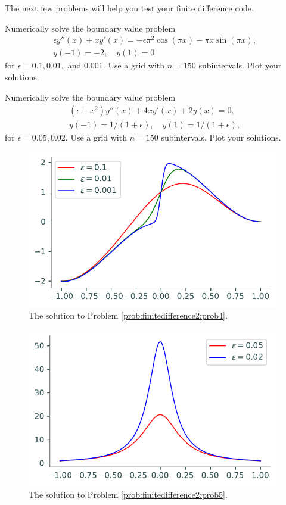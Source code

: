 The next few problems will help you test your finite difference code.

\begin{problem}
Numerically solve the boundary value problem
\begin{align*}
	\epsilon y''(x) + xy'(x) = -\epsilon \pi^2 \cos(\pi x) - \pi x \sin(\pi x), \\
	y(-1) = -2, \quad y(1) = 0,
\end{align*}
for $\epsilon = 0.1, 0.01,$ and $0.001$. Use a grid with $n=150$ subintervals. Plot your solutions.
\label{prob:finitedifference2:prob4}
\end{problem}

\begin{problem}
Numerically solve the boundary value problem
\begin{align*}
	(\epsilon +x^2)y''(x) + 4xy'(x) + 2y(x) = 0, \\
	y(-1) = 1/(1+\epsilon), \quad y(1) = 1/(1+\epsilon),
\end{align*}
for $\epsilon = 0.05, 0.02$. Use a grid with $n=150$ subintervals. Plot your solutions.
\label{prob:finitedifference2:prob5}
\end{problem}

\begin{figure}[h]
\centering
\includegraphics[width=11cm]{figures/figure4.pdf}
\caption{The solution to Problem \ref{prob:finitedifference2:prob4}.
}
\end{figure}

\begin{figure}
\centering
\includegraphics[width=11cm]{figures/figure5.pdf}
\caption{The solution to Problem \ref{prob:finitedifference2:prob5}.
}
\end{figure}
